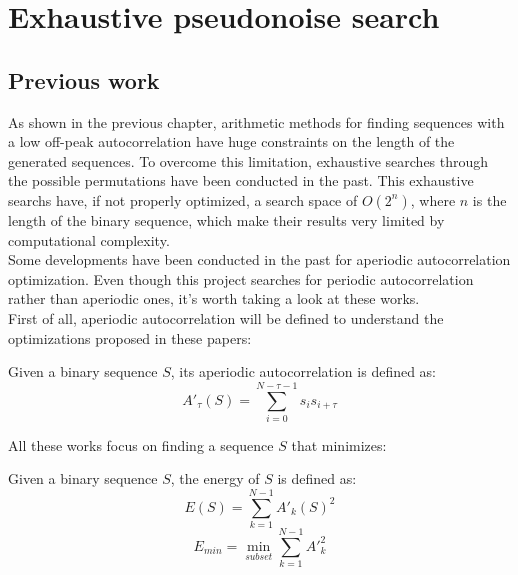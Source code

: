 \chapter{Exhaustive pseudonoise search}
  \section{Previous work}

  As shown in the previous chapter, arithmetic methods for finding sequences
  with a low off-peak autocorrelation have huge constraints on the length of
  the generated sequences. To overcome this limitation, exhaustive searches
  through the possible permutations have been conducted in the past. This
  exhaustive searchs have, if not properly optimized, a search space of
  $O(2^n)$, where $n$ is the length of the binary sequence, which make their
  results very limited by computational complexity.\\

  Some developments have been conducted in the past for aperiodic
  autocorrelation optimization. Even though this project searches for periodic
  autocorrelation rather than aperiodic ones, it's worth taking a look
  at these works.\\

  First of all, aperiodic autocorrelation will be defined to understand
  the optimizations proposed in these papers:\\
  \begin{definition}
      Given a binary sequence $S$, its aperiodic autocorrelation is defined as:
      \begin{equation}
        A'_{\tau}(S) = \sum_{i=0}^{N-\tau-1}s_{i}s_{i+\tau}
      \end{equation}
  \end{definition}

  All these works focus on finding a sequence $S$ that minimizes:

  \begin{definition} Given a binary sequence $S$, the energy of $S$ is defined
    as:
    \begin{equation}
      E(S) = \sum_{k=1}^{N-1} A'_{k}(S)^{2}
    \end{equation}
    \begin{equation}
      E_{min} = \operatorname*{min}_{subset} \sum_{k=1}^{N-1} A'^{2}_{k}
    \end{equation}
  \end{definition}

